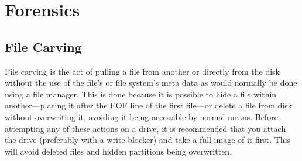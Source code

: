 \chapter{Forensics}
	\label{ch:Forensics}
	\section{File Carving}
		File carving is the act of pulling a file from another or directly from the disk without the use of the file's or file system's meta data as would normally be done using a file manager. 
		This is done because it is possible to hide a file within another---placing it after the EOF line of the first file---or delete a file from disk without overwriting it, avoiding it being accessible by normal means. 
		Before attempting any of these actions on a drive, it is recommended that you attach the drive (preferably with a write blocker) and take a full image of it first. 
		This will avoid deleted files and hidden partitions being overwritten. 
